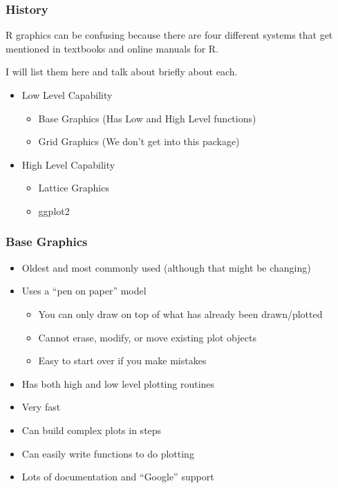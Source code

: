 \documentclass[xcolor=table]{beamer}
\begin{document}
\begin{frame}[fragile]
\frametitle{History}
R graphics can be confusing because there are four different systems that get mentioned in textbooks and online manuals for R. 

I will list them here and talk about briefly about each.

\begin{itemize}
\item Low Level Capability
\begin{itemize}
\item Base Graphics (Has Low and High Level functions)
\item Grid Graphics (We don't get into this package)
\end{itemize}
\item High Level Capability
\begin{itemize}
\item{Lattice Graphics}
\item{ggplot2}
\end{itemize}
\end{itemize}
\end{frame}

%

\begin{frame}[fragile]
\frametitle{Base Graphics}
\begin{itemize}
\item Oldest and most commonly used (although that might be changing)
\item Uses a ``pen on paper'' model
\begin{itemize}
 \item You can only draw on top of what has already been drawn/plotted
 \item Cannot erase, modify, or move existing plot objects
 \item Easy to start over if you make mistakes
\end{itemize}

\item Has both high and low level plotting routines
\item Very fast
\item Can build complex plots in steps 
\item Can easily write functions to do plotting 
\item Lots of documentation and ``Google'' support
\end{itemize}

\end{frame}
\end{document}

